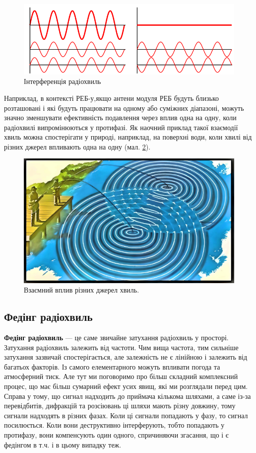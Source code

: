 \documentclass{article}
\begin{document}
\begin{figure}[h!]
\centering
\includegraphics[width=0.7\linewidth]{images/interferense.png}
\caption{\label{fig:interferense}Інтерференція радіохвиль}
\end{figure}

Наприклад, в контексті РЕБ-у,якщо антени модуля РЕБ будуть близько розташовані і які будуть працювати на одному або суміжних діапазоні, можуть значно зменшувати ефективність подавлення через вплив одна на одну, коли радіохвилі випромінюються у протифазі. Як наочний приклад такої взаємодії хвиль можна спостерігати у природі, наприклад, на поверхні води, коли хвилі від різних джерел впливають одна на одну (мал. \ref{fig:two-emmitions}).

\begin{figure}[h!]
\centering
\includegraphics[width=0.6\linewidth]{images/two-emmitions.png}
\caption{\label{fig:two-emmitions}Взаємний вплив різних джерел хвиль.}
\end{figure}

\subsection{Федінг радіохвиль}

\textbf{Федінг радіохвиль} --- це саме звичайне затухання радіохвиль у просторі. Затухання радіохвиль залежить від частоти. Чим вища частота, тим сильніше затухання зазвичай спостерігається, але залежність не є лінійною і залежить від багатьох факторів. Із самого елементарного можуть впливати погода та атмосферний тиск. Але тут ми поговоримо про більш складний комплексний процес, що має більш сумарний ефект усих явищ, які ми розглядали перед цим. Справа у тому, що сигнал надходить до приймача кількома шляхами, а саме із-за перевідбитів, дифракцій та розсіювань ці шляхи мають різну довжину, тому сигнали надходять в різних фазах. Коли ці сигнали попадають у фазу, то сигнал посилюється. Коли вони деструктивно інтерферують, тобто попадають у протифазу, вони компенсують один одного, спричиняючи згасання, що і є федінгом в т.ч. і в цьому випадку теж.
\end{document}
